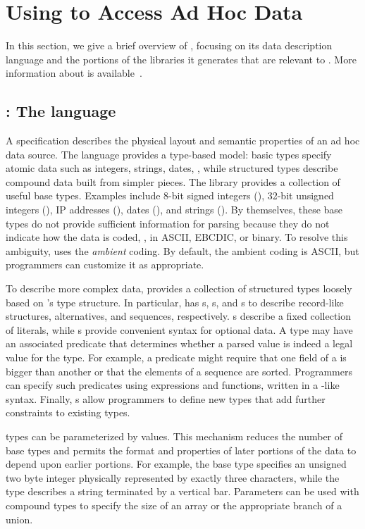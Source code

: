 \section{Using \pads{} to Access Ad Hoc Data}
\label{section:pads}
In this section, we give a brief overview of \pads{}, focusing on its
data description language and the portions of the libraries it generates
that are relevant to \padx{}. More information about \pads{} is
available~\cite{pldi05,padsmanual}.   


\subsection{\pads{}: The language}
\label{subsection:pads-language}
A \pads{} specification describes the physical layout and 
semantic properties of an ad hoc data source. 
The language provides a type-based model:
basic types specify atomic data such as integers, strings, dates, \etc{}, while
structured types describe compound data built from simpler pieces.
The \pads{} library provides a collection of useful base types.
Examples include
8-bit signed integers (),
32-bit unsigned integers (),
IP addresses (), 
dates (), and strings ().
By themselves, these base types do not provide sufficient information for parsing
because they do not indicate how the data is coded, \ie{}, in ASCII, EBCDIC, or binary.  
To resolve this ambiguity, \pads{} uses the \textit{ambient} coding.
By default, the ambient coding is ASCII, but programmers can customize
it as appropriate.

To describe more complex data, \pads{} provides a collection of 
structured types loosely based on \C{}'s type structure.
In particular, \pads{} has 
s, s, and s to describe
record-like structures, alternatives, and sequences, respectively.
s describe a fixed collection of literals, while s 
provide convenient syntax for optional data.
A type may have an associated predicate that determines
whether a parsed value is indeed a legal
value for the type.  For example, a predicate might require that one
field of a  is bigger than another or that the elements
of a sequence are sorted.  Programmers can specify such
predicates using \pads{} expressions and functions, 
written in a \C{}-like syntax.
Finally, \pads{} s allow programmers
to define new types that add further constraints to existing types.

\pads{} types can be parameterized by values.
This mechanism reduces the number of base types and  permits the
format and properties of later portions of the data to depend upon earlier portions.
For example, 
the base type  specifies an unsigned two byte integer
physically represented by exactly three characters, while the type
describes a string terminated by a vertical bar.  Parameters can be 
used with compound types to specify the size of an array or the
appropriate branch of a union.

